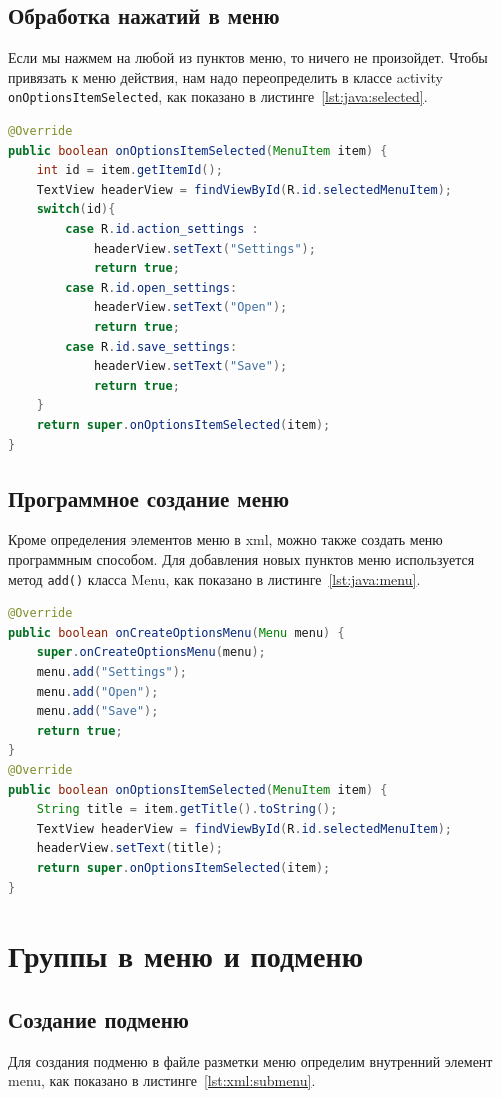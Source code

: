 \subsection{Обработка нажатий в меню}
Если мы нажмем на любой из пунктов меню, то ничего не произойдет. Чтобы
привязать к меню действия, нам надо переопределить в классе activity
\texttt{onOptionsItemSelected},
как показано в листинге~\ref{lst:java:selected}.

\begin{lstlisting}[language=Java
	, label=lst:java:selected
	]
@Override
public boolean onOptionsItemSelected(MenuItem item) {
	int id = item.getItemId();
	TextView headerView = findViewById(R.id.selectedMenuItem);
	switch(id){
		case R.id.action_settings :
			headerView.setText("Settings");
			return true;
		case R.id.open_settings:
			headerView.setText("Open");
			return true;
		case R.id.save_settings:
			headerView.setText("Save");
			return true;
	}
	return super.onOptionsItemSelected(item);
}
\end{lstlisting}

\subsection{Программное создание меню}
Кроме определения элементов меню в xml, можно также создать меню
программным способом. Для добавления новых пунктов меню используется
метод \texttt{add()} класса Menu,
как показано в листинге~\ref{lst:java:menu}.

\begin{lstlisting}[language=Java
	, label=lst:java:menu
	]
@Override
public boolean onCreateOptionsMenu(Menu menu) {
	super.onCreateOptionsMenu(menu);
	menu.add("Settings");
	menu.add("Open");
	menu.add("Save");
	return true;
}
@Override
public boolean onOptionsItemSelected(MenuItem item) {
	String title = item.getTitle().toString();
	TextView headerView = findViewById(R.id.selectedMenuItem);
	headerView.setText(title);
	return super.onOptionsItemSelected(item);
}
\end{lstlisting}

\section{Группы в меню и подменю}
\subsection{Создание подменю}
Для создания подменю в файле разметки меню определим внутренний
элемент menu,
как показано в листинге~\ref{lst:xml:submenu}.

